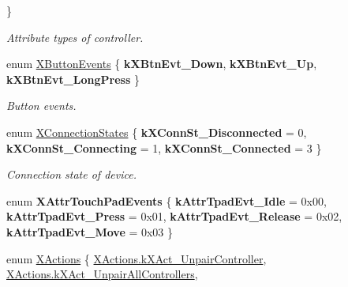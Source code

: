 \begin{DoxyCompactItemize}
 \}
\begin{DoxyCompactList}\small\item\em Attribute types of controller. \end{DoxyCompactList}\item 
\mbox{\label{class_ximmerse_1_1_input_system_1_1_x_device_plugin_a2b1a55b2bd1c82176239be06b2837a36}} 
enum \mbox{\hyperlink{class_ximmerse_1_1_input_system_1_1_x_device_plugin_a2b1a55b2bd1c82176239be06b2837a36}{X\+Button\+Events}} \{ {\bfseries k\+X\+Btn\+Evt\+\_\+\+Down}, 
{\bfseries k\+X\+Btn\+Evt\+\_\+\+Up}, 
{\bfseries k\+X\+Btn\+Evt\+\_\+\+Long\+Press}
 \}
\begin{DoxyCompactList}\small\item\em Button events. \end{DoxyCompactList}\item 
\mbox{\label{class_ximmerse_1_1_input_system_1_1_x_device_plugin_af604a35c067a396ef099047f2dfa928b}} 
enum \mbox{\hyperlink{class_ximmerse_1_1_input_system_1_1_x_device_plugin_af604a35c067a396ef099047f2dfa928b}{X\+Connection\+States}} \{ {\bfseries k\+X\+Conn\+St\+\_\+\+Disconnected} = 0, 
{\bfseries k\+X\+Conn\+St\+\_\+\+Connecting} = 1, 
{\bfseries k\+X\+Conn\+St\+\_\+\+Connected} = 3
 \}
\begin{DoxyCompactList}\small\item\em Connection state of device. \end{DoxyCompactList}\item 
\mbox{\label{class_ximmerse_1_1_input_system_1_1_x_device_plugin_a37806bc0da807552e7738c86ec17dcd9}} 
enum {\bfseries X\+Attr\+Touch\+Pad\+Events} \{ {\bfseries k\+Attr\+Tpad\+Evt\+\_\+\+Idle} = 0x00, 
{\bfseries k\+Attr\+Tpad\+Evt\+\_\+\+Press} = 0x01, 
{\bfseries k\+Attr\+Tpad\+Evt\+\_\+\+Release} = 0x02, 
{\bfseries k\+Attr\+Tpad\+Evt\+\_\+\+Move} = 0x03
 \}
\item 
enum \mbox{\hyperlink{class_ximmerse_1_1_input_system_1_1_x_device_plugin_ab7f817a86e5b3af956089fb089b7d0c3}{X\+Actions}} \{ \newline
\mbox{\hyperlink{class_ximmerse_1_1_input_system_1_1_x_device_plugin_ab7f817a86e5b3af956089fb089b7d0c3af843c25531328f5ad4d32ebcfe8e337d}{X\+Actions.\+k\+X\+Act\+\_\+\+Unpair\+Controller}}, 
\mbox{\hyperlink{class_ximmerse_1_1_input_system_1_1_x_device_plugin_ab7f817a86e5b3af956089fb089b7d0c3a7a029c5a3e5c06867e87cfcc60515b87}{X\+Actions.\+k\+X\+Act\+\_\+\+Unpair\+All\+Controllers}}, 

\end{DoxyCompactItemize}
